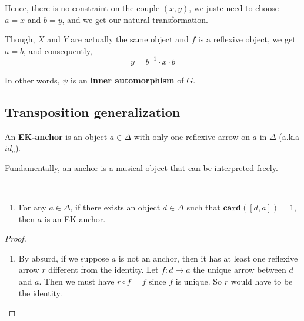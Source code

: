 Hence, there is no constraint on the couple $(x,y)$, we juste need to choose $a = x$ and $b = y$, and we get our natural transformation.

Though, $X$ and $Y$ are actually the same object and $f$ is a reflexive object, we get $a = b$, and consequently,
$$y = b^{-1}\cdot x \cdot b $$

In other words, $\psi$ is an \textbf{inner automorphism} of $G$.


\subsection{Transposition generalization}

\begin{defn}

\end{defn}

\begin{defn}[EK-anchor]
    An \textbf{EK-anchor} is an object $a\in\Delta$  with only one reflexive arrow on $a$ in $\Delta$ (a.k.a $id_a$).
\end{defn}

Fundamentally, an anchor is a musical object that can be interpreted freely.

\begin{prop}~
    \begin{enumerate}
        \item For any $a\in \Delta$, if there exists an object $d\in \Delta$ such that $\textbf{card}([d,a]) = 1$, then $a$ is an EK-anchor.
    \end{enumerate}
    \label{anchorProp}
\end{prop}

\begin{proof}
    \begin{enumerate}
        \item By absurd, if we suppose $a$ is not an anchor, then it has at least one reflexive arrow $r$ different from the identity. Let $f : d\rightarrow a$ the unique arrow between $d$ and $a$. Then we must have $r \circ f = f$ since $f$ is unique. So $r$ would have to be the identity.
    \end{enumerate}
\end{proof}


